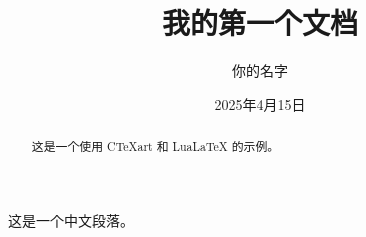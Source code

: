 \documentclass{ctexart}
\title{我的第一个文档}
\author{你的名字}
\date{2025年4月15日}
\begin{document}
\maketitle

\begin{abstract}
这是一个使用 CTeXart 和 LuaLaTeX 的示例。
\end{abstract}

这是一个中文段落。
\end{document}
